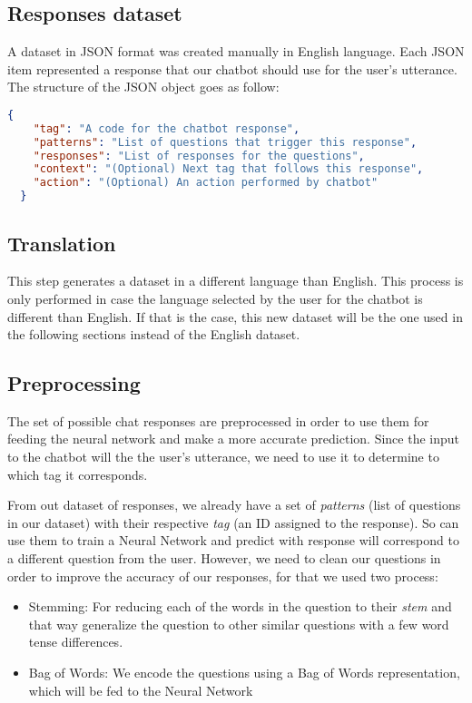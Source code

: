 \documentclass[]{article}
\begin{document}
\subsection{Responses dataset}
A dataset in JSON format was created manually in English language. Each JSON item represented a response that our chatbot should use for the user's utterance. The structure of the JSON object goes as follow:

\begin{lstlisting}[language=json,firstnumber=1, caption=JSON object for a chatbot response]
  {
    "tag": "A code for the chatbot response",
    "patterns": "List of questions that trigger this response",
    "responses": "List of responses for the questions",
    "context": "(Optional) Next tag that follows this response",
    "action": "(Optional) An action performed by chatbot"
  }
\end{lstlisting}

\subsection{Translation}
This step generates a dataset in a different language than English. This process is only performed in case the language selected by the user for the chatbot is different than English. If that is the case, this new dataset will be the one used in the following sections instead of the English dataset.

\subsection{Preprocessing}
The set of possible chat responses are preprocessed in order to use them for feeding the neural network and make a more accurate prediction. Since the input to the chatbot will the the user's utterance, we need to use it to determine to which tag it corresponds.

From out dataset of responses, we already have a set of \emph{patterns} (list of questions in our dataset) with their respective \emph{tag} (an ID assigned to the response). So can use them to train a Neural Network and predict with response will correspond to a different question from the user. However, we need to clean our questions in order to improve the accuracy of our responses, for that we used two process:

\begin{itemize}
  \item{Stemming:} For reducing each of the words in the question to their \emph{stem} and that way generalize the question to other similar questions with a few word tense differences.
  \item{Bag of Words:} We encode the questions using a Bag of Words representation, which will be fed to the Neural Network
\end{itemize}
\end{document}
